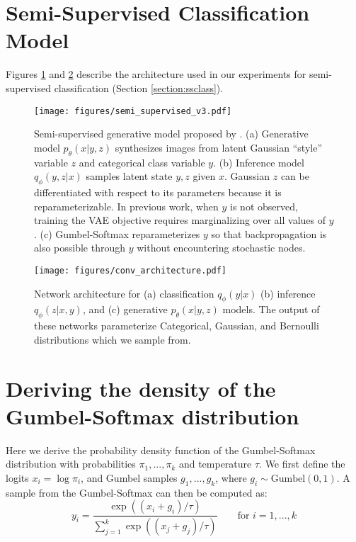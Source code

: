 \documentclass{article} %
\begin{document}
\section{Semi-Supervised Classification Model}
\label{appendix:conv_arch}

Figures \ref{fig:ss_arch} and \ref{fig:conv_arch} describe the architecture used in our experiments for semi-supervised classification (Section \ref{section:ssclass}).

\begin{figure}[ht]
  \centering
\texttt{[image: figures/semi\_supervised\_v3.pdf]}
  \caption{Semi-supervised generative model proposed by \citet{kingma_ssvae}. (a) Generative model $p_\theta(x|y,z)$ synthesizes images from latent Gaussian ``style'' variable $z$ and categorical class variable $y$. (b) Inference model $q_\phi(y,z|x)$ samples latent state $y,z$ given $x$. Gaussian $z$ can be differentiated with respect to its parameters because it is reparameterizable. In previous work, when $y$ is not observed, training the VAE objective requires marginalizing over all values of $y$. (c) Gumbel-Softmax reparameterizes $y$ so that backpropagation is also possible through $y$ without encountering stochastic nodes.} 
 \label{fig:ss_arch}
\end{figure}

\begin{figure}[ht] 
  \centering
\texttt{[image: figures/conv\_architecture.pdf]}
  \caption{Network architecture for (a) classification $q_\phi(y|x)$ (b) inference $q_\phi(z|x,y)$, and (c) generative $p_\theta(x|y,z)$ models. The output of these networks parameterize Categorical, Gaussian, and Bernoulli distributions which we sample from.}
  \label{fig:conv_arch}
\end{figure}

\section{Deriving the density of the Gumbel-Softmax distribution}
\label{appendix:gumbel_derivation}

 Here we derive the probability density function of the Gumbel-Softmax distribution with probabilities $\pi_1, ..., \pi_k$ and temperature $\tau$. We first define the logits $x_i=\log \pi_i$, and Gumbel samples $g_1, ..., g_k$, where $g_i \sim \text{Gumbel}(0, 1)$. A sample from the Gumbel-Softmax can then be computed as:
 \begin{equation}
y_i = \frac{\exp\left((x_i + g_i) / \tau\right)  }{\sum_{j=1}^k \exp\left((x_j + g_j)/\tau \right)}\qquad \text{for } i =1,..., k
\end{equation}
\end{document}
